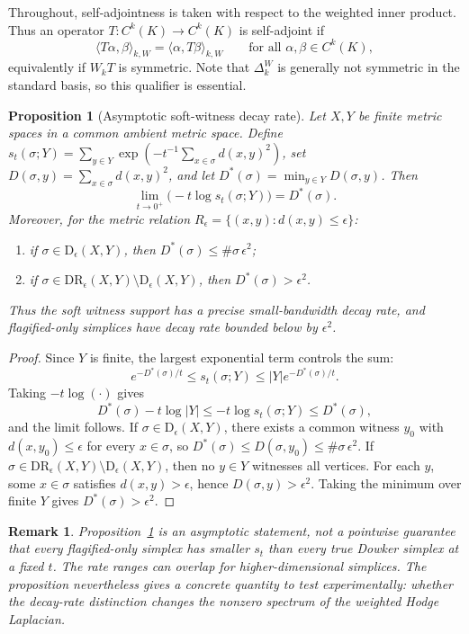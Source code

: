 \documentclass[11pt]{amsart}
\theoremstyle{plain}
\newtheorem{proposition}[theorem]{Proposition}
\newtheorem{remark}[theorem]{Remark}
\newcommand{\Dow}{\mathrm{D}}
\newcommand{\DR}{\mathrm{DR}}
\begin{document}
Throughout, self-adjointness is taken with respect to the weighted inner product. Thus an operator
$T:C^k(K)\to C^k(K)$ is self-adjoint if
\[
\langle T\alpha,\beta\rangle_{k,W}
=
\langle\alpha,T\beta\rangle_{k,W}
\qquad
\text{for all }\alpha,\beta\in C^k(K),
\]
equivalently if $W_kT$ is symmetric. Note that $\Delta_k^W$ is generally not symmetric in the
standard basis, so this qualifier is essential.

\begin{proposition}[Asymptotic soft-witness decay rate]
\label{prop:witness-separation}
Let $X,Y$ be finite metric spaces in a common ambient metric space. Define
$s_t(\sigma;Y)=\sum_{y\in Y}\exp(-t^{-1}\sum_{x\in\sigma}d(x,y)^2)$, set
$D(\sigma,y)=\sum_{x\in\sigma}d(x,y)^2$, and let
$D^{*}(\sigma)=\min_{y\in Y}D(\sigma,y)$.
Then
\[
\lim_{t\to0^{+}}\bigl(-t\log s_t(\sigma;Y)\bigr)=D^{*}(\sigma).
\]
Moreover, for the metric relation $R_\epsilon=\{(x,y):d(x,y)\le\epsilon\}$:
\begin{enumerate}[leftmargin=2em,label=(\roman*)]
\item if $\sigma\in\Dow_\epsilon(X,Y)$, then $D^{*}(\sigma)\le \#\sigma\,\epsilon^2$;
\item if $\sigma\in\DR_\epsilon(X,Y)\setminus\Dow_\epsilon(X,Y)$, then
$D^{*}(\sigma)>\epsilon^2$.
\end{enumerate}
Thus the soft witness support has a precise small-bandwidth decay rate, and flagified-only
simplices have decay rate bounded below by $\epsilon^2$.
\end{proposition}

\begin{proof}
Since $Y$ is finite, the largest exponential term controls the sum:
\[
e^{-D^{*}(\sigma)/t}\le s_t(\sigma;Y)\le |Y|e^{-D^{*}(\sigma)/t}.
\]
Taking $-t\log(\cdot)$ gives
\[
D^{*}(\sigma)-t\log |Y|\le -t\log s_t(\sigma;Y)\le D^{*}(\sigma),
\]
and the limit follows. If $\sigma\in\Dow_\epsilon(X,Y)$, there exists a common witness $y_0$
with $d(x,y_0)\le\epsilon$ for every $x\in\sigma$, so
$D^{*}(\sigma)\le D(\sigma,y_0)\le \#\sigma\,\epsilon^2$. If
$\sigma\in\DR_\epsilon(X,Y)\setminus\Dow_\epsilon(X,Y)$, then no $y\in Y$ witnesses all vertices.
For each $y$, some $x\in\sigma$ satisfies $d(x,y)>\epsilon$, hence
$D(\sigma,y)>\epsilon^2$. Taking the minimum over finite $Y$ gives
$D^{*}(\sigma)>\epsilon^2$.
\end{proof}

\begin{remark}
Proposition~\ref{prop:witness-separation} is an asymptotic statement, not a pointwise guarantee
that every flagified-only simplex has smaller $s_t$ than every true Dowker simplex at a fixed
$t$. The rate ranges can overlap for higher-dimensional simplices. The proposition nevertheless
gives a concrete quantity to test experimentally: whether the decay-rate distinction changes the
nonzero spectrum of the weighted Hodge Laplacian.
\end{remark}
\end{document}
